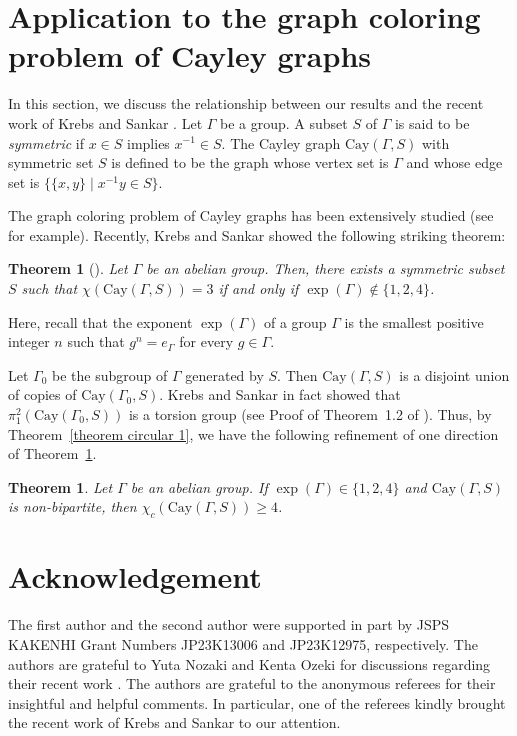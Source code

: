 \documentclass[11pt, amsfonts]{amsart}
\numberwithin{equation}{section}
\newtheorem{theorem}[thm]{Theorem}
\theoremstyle{definition}
\theoremstyle{remark}
\newcommand{\ZZ}{\mathbb{Z}}
\newcommand{\Cay}{\mathrm{Cay}}
\newcommand{\N}{\mathcal{N}}
\begin{document}
\section{Application to the graph coloring problem of Cayley graphs}

In this section, we discuss the relationship between our results and the recent work of Krebs and Sankar \cite{KrebsSankar}. Let $\Gamma$ be a group. A subset $S$ of $\Gamma$ is said to be \emph{symmetric} if $x \in S$ implies $x^{-1} \in S$. The Cayley graph $\Cay(\Gamma, S)$ with symmetric set $S$ is defined to be the graph whose vertex set is $\Gamma$ and whose edge set is $\{ \{x,y\} \mid x^{-1} y \in S \}$.

The graph coloring problem of Cayley graphs has been extensively studied (see \cite{Alon, Czerwinski} for example). Recently, Krebs and Sankar \cite{KS} showed the following striking theorem:

\begin{theorem}[{\cite[Theorem~1.2]{KrebsSankar}}] \label{theorem KS}
Let $\Gamma$ be an abelian group. Then, there exists a symmetric subset $S$ such that $\chi(\Cay(\Gamma, S)) = 3$ if and only if $\exp(\Gamma) \not\in \{ 1,2,4\}$.
\end{theorem}

Here, recall that the exponent $\exp(\Gamma)$ of a group $\Gamma$ is the smallest positive integer $n$ such that $g^n = e_\Gamma$ for every $g \in \Gamma$.

Let $\Gamma_0$ be the subgroup of $\Gamma$ generated by $S$. Then $\Cay(\Gamma, S)$ is a disjoint union of copies of $\Cay(\Gamma_0, S)$. Krebs and Sankar in fact showed that $\pi_1^2(\Cay(\Gamma_0, S))$ is a torsion group (see Proof of Theorem~1.2 of \cite{KrebsSankar}). Thus, by Theorem~\ref{theorem circular 1}, we have the following refinement of one direction of Theorem~\ref{theorem KS}.


\begin{theorem} \label{theorem refinement}
Let $\Gamma$ be an abelian group. If $\exp(\Gamma) \in \{ 1,2,4\}$ and $\Cay(\Gamma, S)$ is non-bipartite, then $\chi_c(\Cay(\Gamma, S)) \ge 4$.
\end{theorem}



\section*{Acknowledgement}
The first author and the second author were supported in part by JSPS KAKENHI Grant Numbers JP23K13006 and JP23K12975, respectively. The authors are grateful to Yuta Nozaki and Kenta Ozeki for discussions regarding their recent work \cite{Kaiseretal}. The authors are grateful to the anonymous referees for their insightful and helpful comments. In particular, one of the referees kindly brought the recent work \cite{KrebsSankar} of Krebs and Sankar to our attention.
\end{document}
